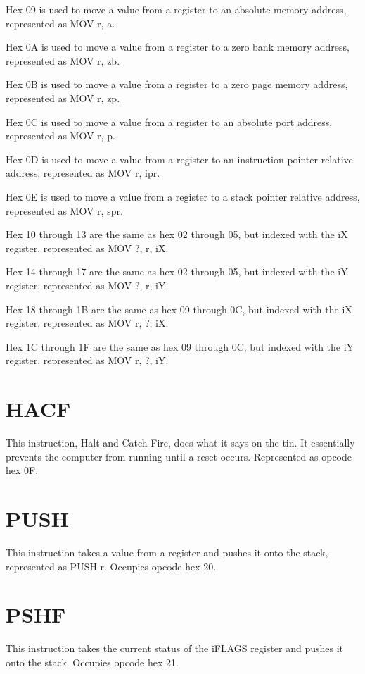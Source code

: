 \documentclass[letterpaper,12pt]{book}
\begin{document}
Hex 09 is used to move a value from a register to an absolute memory address, represented as MOV r, a.

Hex 0A is used to move a value from a register to a zero bank memory address, represented as MOV r, zb.

Hex 0B is used to move a value from a register to a zero page memory address, represented as MOV r, zp.

Hex 0C is used to move a value from a register to an absolute port address, represented as MOV r, p.

Hex 0D is used to move a value from a register to an instruction pointer relative address, represented as MOV r, ipr.

Hex 0E is used to move a value from a register to a stack pointer relative address, represented as MOV r, spr.

Hex 10 through 13 are the same as hex 02 through 05, but indexed with the iX register, represented as MOV ?, r, iX.

Hex 14 through 17 are the same as hex 02 through 05, but indexed with the iY register, represented as MOV ?, r, iY.

Hex 18 through 1B are the same as hex 09 through 0C, but indexed with the iX register, represented as MOV r, ?, iX.

Hex 1C through 1F are the same as hex 09 through 0C, but indexed with the iY register, represented as MOV r, ?, iY. 

\section{HACF}

This instruction, Halt and Catch Fire, does what it says on the tin. It essentially prevents the computer from running until a reset occurs. Represented as opcode hex 0F.

\section{PUSH}

This instruction takes a value from a register and pushes it onto the stack, represented as PUSH r. Occupies opcode hex 20.

\section{PSHF}

This instruction takes the current status of the iFLAGS register and pushes it onto the stack. Occupies opcode hex 21.
\end{document}
